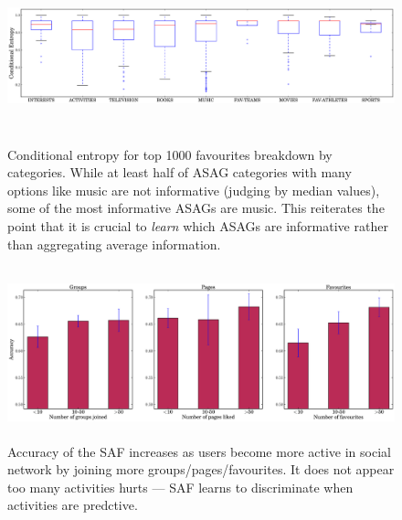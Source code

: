 
\begin{figure}[tbph!]
\centering
\includegraphics[height=50mm, width=160mm]{data/newPlots/CEvsFavouriteTypes.eps}
\vspace{-3mm}
\caption{Conditional entropy for top 1000 favourites breakdown by categories.  While
at least half of ASAG categories
with many options like music are not informative (judging by median values), 
some of the most informative ASAGs are music.  This reiterates
the point that it is crucial to \emph{learn} which ASAGs 
are informative rather than aggregating average information.}
\label{Fig5}
\end{figure}


\begin{figure}[tbh!]
\centering
\includegraphics[width=180mm, height=50mm]{data/newPlots/AccuracyVsMembership.eps}
\vspace{-6mm}
\caption{Accuracy of the SAF increases as users become more active in social network by joining more groups/pages/favourites.  It does not appear too many activities hurts --- SAF learns to discriminate when activities are predctive.}
\label{AccuracyVsmembership}
\end{figure}

